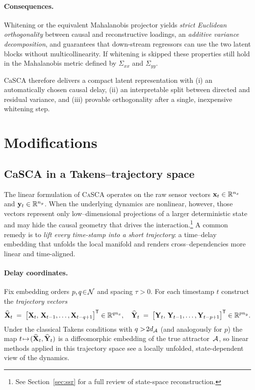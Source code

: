 \documentclass[14pt]{extarticle}
\begin{document}
	\paragraph{Consequences.}
	Whitening or the equivalent Mahalanobis projector yields  
	\emph{strict Euclidean orthogonality} between causal and reconstructive
	loadings, an \emph{additive variance decomposition}, and guarantees that
	down-stream regressors can use the two latent blocks without
	multicollinearity.  
	If whitening is skipped these properties still hold in the Mahalanobis
	metric defined by \(\Sigma_{xx}\) and \(\Sigma_{yy}\).
	
	\bigskip
	\noindent
	CaSCA therefore delivers a compact latent representation with (i) an
	automatically chosen causal delay, (ii) an interpretable split between
	directed and residual variance, and (iii) provable orthogonality after a
	single, inexpensive whitening step.
	
	\section{Modifications} \label{sec:mods}
	\subsection{CaSCA in a Takens–trajectory space}\label{subsec:purecca-traj}
	
	The linear formulation of \textsc{CaSCA} operates on the raw sensor
	vectors $\mathbf{x}_t\in\mathbb{R}^{n_x}$ and $\mathbf{y}_t\in\mathbb{R}^{n_y}$.  
	When the underlying dynamics are nonlinear, however, those vectors
	represent only low–dimensional projections of a larger deterministic
	state and may hide the causal geometry that drives the
	interaction.\footnote{See Section~\ref{sec:ssr} for a full review of
		state-space reconstruction.}  
	A common remedy is to \emph{lift every time-stamp into a
		short trajectory}: a time–delay embedding that unfolds the local
	manifold and renders cross–dependencies more linear and
	time-aligned.
	
	\paragraph{Delay coordinates.}
	Fix embedding orders $p,q\!\in\!\mathcal{N}$ and spacing $\tau>0$.  
	For each timestamp $t$ construct the
	\emph{trajectory vectors}
	\[
	\widehat{\mathbf{X}}_t \;=\;
	\bigl[\mathbf{X}_t,\,\mathbf{X}_{t-1},\dots,\mathbf{X}_{t-q+1}\bigr]^{\mathsf{T}}\in\mathbb{R}^{q n_x},
	\quad
	\widehat{\mathbf{Y}}_t \;=\;
	\bigl[\mathbf{Y}_t,\,\mathbf{Y}_{t-1},\dots,\mathbf{Y}_{t-p+1}\bigr]^{\mathsf{T}}\in\mathbb{R}^{p n_y}.
	\]
	Under the classical Takens conditions with $q>\!2d_{\mathcal{A}}$ (and
	analogously for $p$) the map
	$t\!\mapsto\!(\widehat{\mathbf{X}}_t,\widehat{\mathbf{Y}}_t)$ is a diffeomorphic
	embedding of the true attractor~$\mathcal{A}$, so linear methods applied in this
	trajectory space see a locally unfolded, \mbox{state-dependent} view of
	the dynamics.
	
\end{document}

